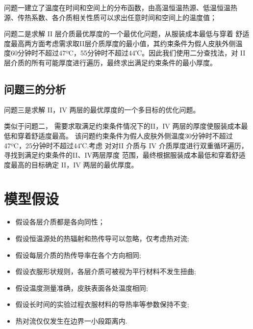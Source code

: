 \documentclass{cumcmthesis}
\begin{document}
        问题一建立了温度在时间和空间上的分布函数，由高温恒温热源、低温恒温热
        源、传热系数、各介质相关性质可以求出任意时间和空间上的温度值；

        问题二是求解 II 层介质最优厚度的一个最优化问题，从服装成本最低与穿着
        舒适度最高两方面考虑需求取II层介质厚度的最小值，其约束条件为假人皮肤外侧温
        度60分钟时不超过47ºC，55分钟时不超过44℃。因此我们使用二分查找法，对
        II 层介质的所有可能厚度进行遍历，最终求出满足约束条件的最小厚度。


    \subsection{问题三的分析}

        问题三是求解 II，IV 两层的最优厚度的一个多目标的优化问题。
        
        类似于问题二，
        需要求取满足约束条件情况下的II，IV 两层的厚度使服装成本最低和穿着舒适度最高。
        该问题约束条件为假人皮肤外侧温度30分钟时不超过47ºC，25分钟时不超过44℃.考虑
        对对II 介质与 IV 介质厚度进行双重循环遍历，寻找到满足约束条件的II、IV两层厚度
        范围，最终根据服装成本最低和穿着舒适度最高的目标确定 II，IV 两层的最优厚度。
\section{模型假设}

\begin{itemize}
\item 假设各层介质都是各向同性；
\item 假设恒温源处的热辐射和热传导可以忽略，仅考虑热对流;
\item 假设每层介质的热传导率在各个方向相同;
\item 假设衣服形状规则，各层介质可被视为平行材料不发生扭曲;
\item 假设温度测量准确，皮肤表面各处温度相同;
\item 假设长时间的实验过程衣服材料的导热率等参数保持不变;
\item 热对流仅仅发生在边界一小段距离内.
\end{itemize}
\end{document}
